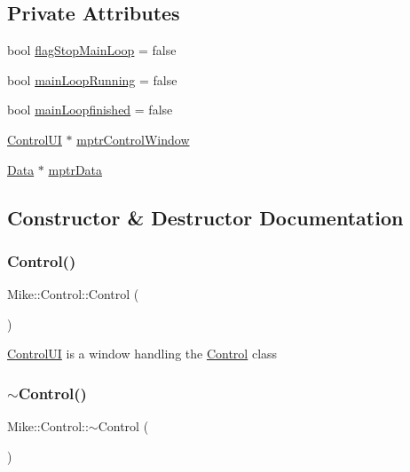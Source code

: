 \subsection*{Private Attributes}
\begin{DoxyCompactItemize}
\item 
bool \hyperlink{class_mike_1_1_control_a800d1dc7b58dc3af7c081225009c898f}{flag\+Stop\+Main\+Loop} = false
\item 
bool \hyperlink{class_mike_1_1_control_af17a58f80bda54fda5b0a5167c8f04ed}{main\+Loop\+Running} = false
\item 
bool \hyperlink{class_mike_1_1_control_a7749b97976e1bb3e7ea49c7d63531dfc}{main\+Loopfinished} = false
\item 
\hyperlink{class_mike_1_1_control_u_i}{Control\+UI} $\ast$ \hyperlink{class_mike_1_1_control_ae6eb65158d5ab90cebb53cb46abf3d3c}{mptr\+Control\+Window}
\item 
\hyperlink{class_mike_1_1_data}{Data} $\ast$ \hyperlink{class_mike_1_1_control_ad372b18cce9cd2fbd276df12bb4e886c}{mptr\+Data}
\end{DoxyCompactItemize}


\subsection{Constructor \& Destructor Documentation}
\mbox{\label{class_mike_1_1_control_ac9a2e3b56773b1eadab7297327a9fbcc}} 
\subsubsection{\texorpdfstring{Control()}{Control()}}
{\footnotesize\ttfamily Mike\+::\+Control\+::\+Control (\begin{DoxyParamCaption}{ }\end{DoxyParamCaption})}

\hyperlink{class_mike_1_1_control_u_i}{Control\+UI} is a window handling the \hyperlink{class_mike_1_1_control}{Control} class \mbox{\label{class_mike_1_1_control_aa3395e0509ab5b980732ab0e3a29ce4d}} 
\subsubsection{\texorpdfstring{$\sim$\+Control()}{~Control()}}
{\footnotesize\ttfamily Mike\+::\+Control\+::$\sim$\+Control (\begin{DoxyParamCaption}{ }\end{DoxyParamCaption})}




